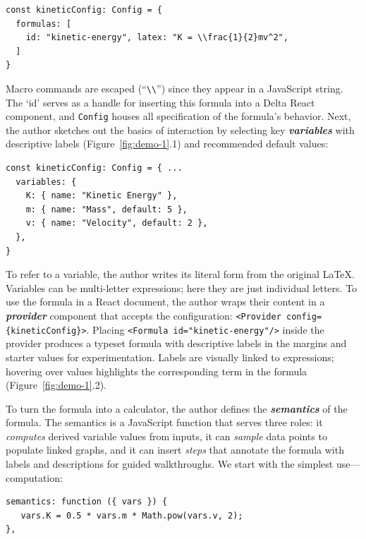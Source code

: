 \begin{tcolorbox}[codebox]
\begin{lstlisting}[style=jsstyle]
const kineticConfig: Config = {
  formulas: [
    id: "kinetic-energy", latex: "K = \\frac{1}{2}mv^2",
  ]
}
\end{lstlisting}
\end{tcolorbox}

Macro commands are escaped (``\texttt{\textbackslash{}\textbackslash{}}'') since they appear in a JavaScript string. The `id' serves as a handle for inserting this formula into a Delta React component, and \texttt{Config} houses all specification of the formula's behavior. Next, the author sketches out the basics of interaction by selecting key \textbf{\emph{variables}} with descriptive labels (Figure~\ref{fig:demo-1}.1) and recommended default values:

\begin{tcolorbox}[codebox]
\begin{lstlisting}[style=jsstyle]
const kineticConfig: Config = { ...
  variables: {
    K: { name: "Kinetic Energy" },
    m: { name: "Mass", default: 5 },
    v: { name: "Velocity", default: 2 },
  },
}
\end{lstlisting}
\end{tcolorbox}

To refer to a variable, the author writes its literal form from the original LaTeX. Variables can be multi-letter expressions; here they are just individual letters. To use the formula in a React document, the author wraps their content in a \textbf{\emph{provider}} component that accepts the configuration: \verb|<Provider config={kineticConfig}>|. Placing \verb|<Formula id="kinetic-energy"/>| inside the provider produces a typeset formula with descriptive labels in the margins and starter values for experimentation. Labels are visually linked to expressions; hovering over values highlights the corresponding term in the formula (Figure~\ref{fig:demo-1}.2). 

To turn the formula into a calculator, the author defines the \textbf{\emph{semantics}} of the formula. The semantics is a JavaScript function that serves three roles: it \emph{computes} derived variable values from inputs, it can \emph{sample} data points to populate linked graphs, and it can insert \emph{steps} that annotate the formula with labels and descriptions for guided walkthroughs. We start with the simplest use---computation:

\begin{tcolorbox}[codebox]
\begin{lstlisting}[style=jsstyle]
semantics: function ({ vars }) {
   vars.K = 0.5 * vars.m * Math.pow(vars.v, 2);
},
\end{lstlisting}
\end{tcolorbox}

